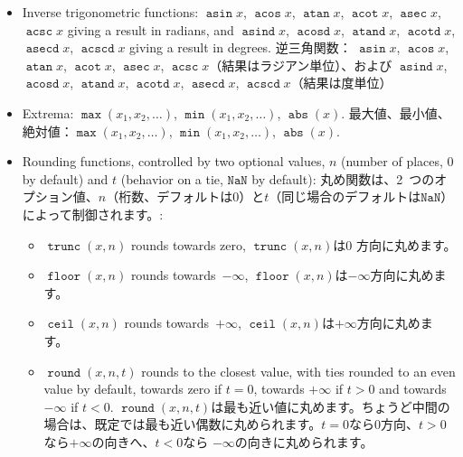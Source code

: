 \documentclass{ltxguide}
\newcommand\jpnewline{\vspace{3pt}\newline}
\providecommand\fpop[1]{\mathop{\texttt{#1}}}
\providecommand\nan{\texttt{NaN}}
\begin{document}
\begin{itemize}
    \jpnewline
     三角関数： 引数はラジアンでとる $\fpop{sin} x$、$\fpop{cos} x$、$\fpop{tan} x$、$\fpop{cot} x$、$\fpop{sec} x$、$\fpop{csc} x$、および引数を度数法（度）でとる $\fpop{sind} x$、$\fpop{cosd} x$、$\fpop{tand} x$、$\fpop{cotd} x$、$\fpop{secd} x$、$\fpop{cscd} x$。
  \item Inverse trigonometric functions: $\fpop{asin} x$,
    $\fpop{acos} x$, $\fpop{atan} x$,
    $\fpop{acot} x$, $\fpop{asec} x$,
    $\fpop{acsc} x$ giving a result in radians, and
    $\fpop{asind} x$, $\fpop{acosd} x$,
    $\fpop{atand} x$, $\fpop{acotd} x$,
    $\fpop{asecd} x$, $\fpop{acscd} x$ giving a result
    in degrees.
    \jpnewline
       逆三角関数： $\fpop{asin} x$,
$\fpop{acos} x$, $\fpop{atan} x$,
$\fpop{acot} x$, $\fpop{asec} x$,
$\fpop{acsc} x$（結果はラジアン単位）、および
$\fpop{asind} x$, $\fpop{acosd} x$,
$\fpop{atand} x$, $\fpop{acotd} x$,
$\fpop{asecd} x$, $\fpop{acscd} x$（結果は度単位）
  \item Extrema: $\fpop{max}(x_{1},x_{2},\ldots)$, $\fpop{min}(x_{1},x_{2},\ldots)$,
    $\fpop{abs}(x)$.
    \jpnewline
     最大値、最小値、絶対値：$\fpop{max}(x_{1},x_{2},\ldots)$, $\fpop{min}(x_{1},x_{2},\ldots)$,    $\fpop{abs}(x)$.
  \item Rounding functions, controlled by two optional
    values,  $n$ (number of places, $0$ by default) and
      $t$ (behavior on a tie, $\nan$ by default):
      \jpnewline
       丸め関数は、2~つのオプション値、$n$（桁数、デフォルトは$0$）と$t$（同じ場合のデフォルトは$\nan$）によって制御されます。:
    \begin{itemize}
    \item $\fpop{trunc}(x,n)$ rounds towards zero,
    \jpnewline
        $\fpop{trunc}(x,n)$は0 方向に丸めます。
    \item $\fpop{floor}(x,n)$ rounds towards~$-\infty$,
    \jpnewline
      $\fpop{floor}(x,n)$は$-\infty$方向に丸めます。
    \item $\fpop{ceil}(x,n)$ rounds towards~$+\infty$,
    \jpnewline
    $\fpop{ceil}(x,n)$は$+\infty$方向に丸めます。
    \item $\fpop{round}(x,n,t)$ rounds to the closest value, with
    ties rounded to an even value by default, towards zero if $t=0$,
    towards $+\infty$ if $t>0$ and towards $-\infty$ if $t<0$.
    \jpnewline
      $\fpop{round}(x,n,t)$は最も近い値に丸めます。ちょうど中間の場合は、既定では最も近い偶数に丸められます。$t=0$なら0方向、$t>0$なら$+\infty$の向きへ、$t<0$なら $-\infty$の向きに丸められます。
    \end{itemize}

\end{itemize}
\end{document}
